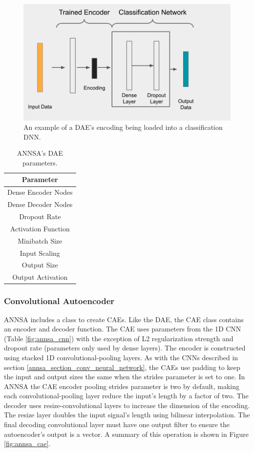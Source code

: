 \begin{figure}[H]
\centering
\includegraphics[trim=0 40 85 0,clip,width=0.8\linewidth]{images/annsa_daednn.png}
\caption{An example of a DAE's encoding being loaded into a classification DNN.}
\label{fig:annsa_daednn}
\end{figure}


\begin{table}[H]
\centering
\caption{ANNSA's DAE parameters.}
\begin{tabular}{c}
\hline
Parameter \\ \hline
Dense Encoder Nodes \\
Dense Decoder Nodes \\
Dropout Rate \\
Activation Function \\
Minibatch Size \\ 
Input Scaling \\
Output Size \\
Output Activation \\ \hline
\end{tabular}
\label{table:annsa_dae_params}
\end{table}



\subsubsection{Convolutional Autoencoder}

ANNSA includes a class to create CAEs. Like the DAE, the CAE class contains an encoder and decoder function. The CAE uses parameters from the 1D CNN (Table \ref{fig:annsa_cnn}) with the exception of L2 regularization strength and dropout rate (parameters only used by dense layers). The encoder is constructed using stacked 1D convolutional-pooling layers. As with the CNNs described in section \ref{annsa_section_conv_neural_network}, the CAEs use padding to keep the input and output sizes the same when the strides parameter is set to one. In ANNSA the CAE encoder pooling strides parameter is two by default, making each convolutional-pooling layer reduce the input's length by a factor of two. The decoder uses resize-convolutional layers to increase the dimension of the encoding. The resize layer doubles the input signal's length using bilinear interpolation. The final decoding convolutional layer must have one output filter to ensure the autoencoder's output is a vector. A summary of this operation is shown in Figure \ref{fig:annsa_cae}.

